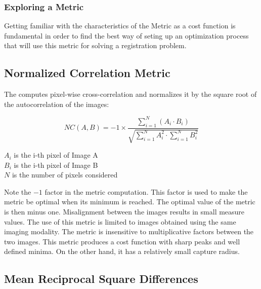 \subsubsection{Exploring a Metric}
\label{sec:ExploringAMetric}

Getting familiar with the characteristics of the Metric as a cost function is
fundamental in order to find the best way of seting up an optimization process
that will use this metric for solving a registration problem. 

\ifitkFullVersion

\fi


\subsection{Normalized Correlation Metric}
\label{sec:NormalizedCorrelationMetric}

The  computes pixel-wise
cross-correlation and normalizes it by the square root of the autocorrelation
of the images:

\begin{equation}
NC(A,B) = -1 \times \frac{ \sum_{i=1}^N \left( A_i \cdot B_i \right) }
         { \sqrt { \sum_{i=1}^N A_i^2  \cdot \sum_{i=1}^N B_i^2 } }
\end{equation}
\begin{center}
$A_i$ is the i-th pixel of Image A\\ 
$B_i$ is the i-th pixel of Image B\\
$N$ is the number of pixels considered
\end{center}

Note the $-1$ factor in the metric computation. This factor is used to make the
metric be optimal when its minimum is reached.  The optimal value of the metric
is then minus one. Misalignment between the images results in small measure
values.  The use of this metric is limited to images obtained using the same
imaging modality.  The metric is insensitive to multiplicative factors between
the two images.  This metric produces a cost function with sharp peaks and well
defined minima.  On the other hand, it has a relatively small capture radius.

\subsection{Mean Reciprocal Square Differences}
\label{sec:MeanReciprocalSquareDifferenceMetric}

